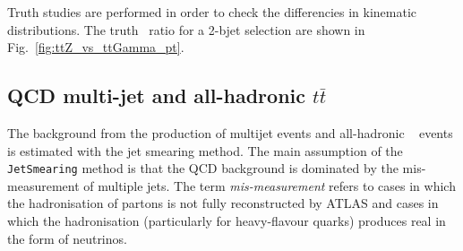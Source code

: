 
Truth studies are performed in order to check the differencies in
kinematic distributions. The truth \pT\ ratio for a 2-bjet
selection are shown in Fig.~\ref{fig:ttZ_vs_ttGamma_pt}.


\subsection{QCD multi-jet and all-hadronic \boldmath$t\bar{t}$ }
\label{sec:QCDbkgd}
The background from the production of multijet events and all-hadronic
\ttbar~ events is estimated with the jet smearing method. The main assumption of the \verb| JetSmearing| method is that the QCD background is dominated by the mis-measurement of multiple jets. The term {\it mis-measurement} refers to cases in which the hadronisation of partons is not fully reconstructed by ATLAS and cases in which the hadronisation (particularly for heavy-flavour quarks) produces real \met in the form of neutrinos.

